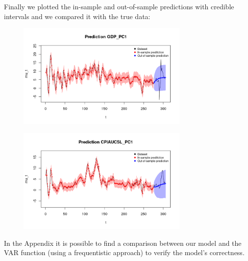 Finally we plotted the in-sample and out-of-sample predictions with credible intervals and we compared it with the true data: \\  
\begin{figure}[H]
    \centering
    \includegraphics[width=0.75\textwidth]{images/6-VAR/gdp_prediction.png}
    \label{fig:VAR_first}
\end{figure}
\begin{figure}[H]
    \centering
    \includegraphics[width=0.75\textwidth]{images/6-VAR/infl_prediction.png}
    \label{fig:VAR_second}
\end{figure}
In the Appendix it is possible to find a comparison between our model and the VAR function (using a frequentistic approach) to verify the model's correctness.